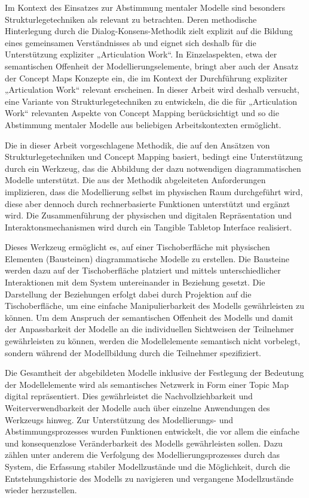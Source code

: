 Im Kontext des Einsatzes zur Abstimmung mentaler Modelle sind besonders Strukturlegetechniken als relevant zu betrachten. Deren methodische Hinterlegung durch die Dialog-Konsens-Methodik zielt explizit auf die Bildung eines gemeinsamen Verständnisses ab und eignet sich deshalb für die Unterstützung expliziter „Articulation Work“. In Einzelaspekten, etwa der semantischen Offenheit der Modellierungselemente, bringt aber auch der Ansatz der Concept Maps Konzepte ein, die im Kontext der Durchführung expliziter „Articulation Work“ relevant erscheinen. In dieser Arbeit wird deshalb versucht, eine Variante von Strukturlegetechniken zu entwickeln, die die für „Articulation Work“ relevanten Aspekte von Concept Mapping berücksichtigt und so die Abstimmung mentaler Modelle aus beliebigen Arbeitskontexten ermöglicht. 

Die in dieser Arbeit vorgeschlagene Methodik, die auf den Ansätzen von Strukturlegetechniken und Concept Mapping basiert, bedingt eine Unterstützung durch ein Werkzeug, das die Abbildung der dazu notwendigen diagrammatischen Modelle unterstützt. Die aus der Methodik abgeleiteten Anforderungen implizieren, dass die Modellierung selbst im physischen Raum durchgeführt wird, diese aber dennoch durch rechnerbasierte Funktionen unterstützt und ergänzt wird. Die Zusammenführung der physischen und digitalen Repräsentation und Interaktonsmechanismen wird durch ein Tangible Tabletop Interface realisiert.

Dieses Werkzeug ermöglicht es, auf einer Tischoberfläche mit physischen Elementen (Bausteinen) diagrammatische Modelle zu erstellen. Die Bausteine werden dazu auf der Tischoberfläche platziert und mittels unterschiedlicher Interaktionen mit dem System untereinander in Beziehung gesetzt. Die Darstellung der Beziehungen erfolgt dabei durch Projektion auf die Tischoberfläche, um eine einfache Manipulierbarkeit des Modells gewährleisten zu können. Um dem Anspruch der semantischen Offenheit des Modells und damit der Anpassbarkeit der Modelle an die individuellen Sichtweisen der Teilnehmer gewährleisten zu können, werden die Modellelemente semantisch nicht vorbelegt, sondern während der Modellbildung durch die Teilnehmer spezifiziert. 

Die Gesamtheit der abgebildeten Modelle inklusive der Festlegung der Bedeutung der Modellelemente wird als semantisches Netzwerk in Form einer Topic Map digital repräsentiert. Dies gewährleistet die Nachvollziehbarkeit und Weiterverwendbarkeit der Modelle auch über einzelne Anwendungen des Werkzeugs hinweg. Zur Unterstützung des Modellierungs- und Abstimmungsprozesses wurden Funktionen entwickelt, die vor allem die einfache und konsequenzlose Veränderbarkeit des Modells gewährleisten sollen. Dazu zählen unter anderem die Verfolgung des Modellierungsprozesses durch das System, die Erfassung stabiler Modellzustände und die Möglichkeit, durch die Entstehungshistorie des Modells zu navigieren und vergangene Modellzustände wieder herzustellen.  

